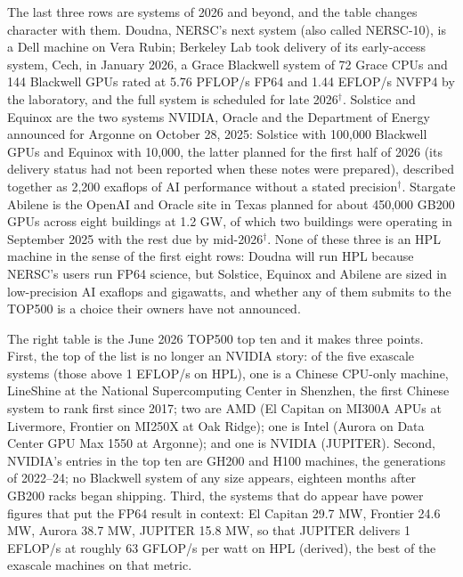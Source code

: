 \documentclass[11pt,letterpaper]{article}
\begin{document}
The last three rows are systems of 2026 and beyond, and the table changes character with them. Doudna, NERSC's next system (also called NERSC-10), is a Dell machine on Vera Rubin; Berkeley Lab took delivery of its early-access system, Cech, in January 2026, a Grace Blackwell system of 72 Grace CPUs and 144 Blackwell GPUs rated at 5.76 PFLOP/s FP64 and 1.44 EFLOP/s NVFP4 by the laboratory, and the full system is scheduled for late 2026$^\dagger$. Solstice and Equinox are the two systems NVIDIA, Oracle and the Department of Energy announced for Argonne on October 28, 2025: Solstice with 100,000 Blackwell GPUs and Equinox with 10,000, the latter planned for the first half of 2026 (its delivery status had not been reported when these notes were prepared), described together as 2,200 exaflops of AI performance without a stated precision$^\dagger$. Stargate Abilene is the OpenAI and Oracle site in Texas planned for about 450,000 GB200 GPUs across eight buildings at 1.2 GW, of which two buildings were operating in September 2025 with the rest due by mid-2026$^\dagger$. None of these three is an HPL machine in the sense of the first eight rows: Doudna will run HPL because NERSC's users run FP64 science, but Solstice, Equinox and Abilene are sized in low-precision AI exaflops and gigawatts, and whether any of them submits to the TOP500 is a choice their owners have not announced.

The right table is the June 2026 TOP500 top ten and it makes three points. First, the top of the list is no longer an NVIDIA story: of the five exascale systems (those above 1 EFLOP/s on HPL), one is a Chinese CPU-only machine, LineShine at the National Supercomputing Center in Shenzhen, the first Chinese system to rank first since 2017; two are AMD (El Capitan on MI300A APUs at Livermore, Frontier on MI250X at Oak Ridge); one is Intel (Aurora on Data Center GPU Max 1550 at Argonne); and one is NVIDIA (JUPITER). Second, NVIDIA's entries in the top ten are GH200 and H100 machines, the generations of 2022--24; no Blackwell system of any size appears, eighteen months after GB200 racks began shipping. Third, the systems that do appear have power figures that put the FP64 result in context: El Capitan 29.7 MW, Frontier 24.6 MW, Aurora 38.7 MW, JUPITER 15.8 MW, so that JUPITER delivers 1 EFLOP/s at roughly 63 GFLOP/s per watt on HPL (derived), the best of the exascale machines on that metric.
\end{document}
